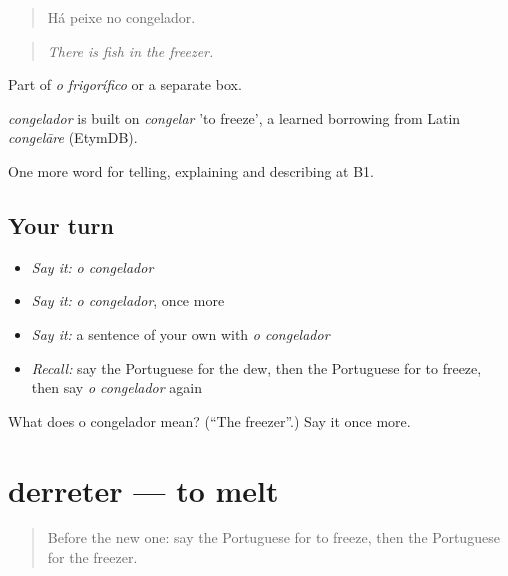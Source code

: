 \begin{quote}
Há peixe no congelador.
\end{quote}

\begin{quote}
\emph{There is fish in the freezer.}
\end{quote}

Part of \emph{o frigorífico} or a separate box.

\begin{cousinweb}
\emph{congelador} is built on \emph{congelar} 'to freeze', a learned borrowing from Latin \emph{congelāre} (EtymDB).
\end{cousinweb}

\begin{grammarlens}[title={What you've built}]
One more word for telling, explaining and describing at B1.
\end{grammarlens}

\subsection*{Your turn}
\begin{itemize}
\raggedright
  \item \emph{Say it:} \emph{o congelador}
  \item \emph{Say it:} \emph{o congelador}, once more
  \item \emph{Say it:} a sentence of your own with \emph{o congelador}
  \item \emph{Recall:} say the Portuguese for the dew, then the Portuguese for to freeze, then say \emph{o congelador} again
\end{itemize}

\begin{tcolorbox}[breakable,colback=teal!4,colframe=teal!35!black,title={Before you move on}]
What does o congelador mean? (\textquotedblleft{}The freezer\textquotedblright{}.) Say it once more.
\end{tcolorbox}
\section[derreter]{derreter — to melt}

\label{lesson:PT-C464-derreter}



\begin{quote}
Before the new one: say the Portuguese for to freeze, then the Portuguese for the freezer.
\end{quote}

